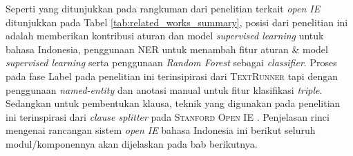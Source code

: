 Seperti yang ditunjukkan pada rangkuman dari penelitian terkait \textit{open IE} ditunjukkan pada Tabel \ref{tab:related_works_summary}, posisi dari penelitian ini adalah memberikan kontribusi aturan dan model \textit{supervised learning} untuk bahasa Indonesia, penggunaan NER untuk menambah fitur aturan \& model \textit{supervised learning} serta penggunaan \textit{Random Forest} sebagai \textit{classifier}. Proses pada fase Label pada penelitian ini terinsipirasi dari \textsc{TextRunner} \citep{banko2007open} tapi dengan penggunaan \textit{named-entity} dan anotasi manual untuk fitur klasifikasi \textit{triple}. Sedangkan untuk pembentukan klausa, teknik yang digunakan pada penelitian ini terinspirasi dari \textit{clause splitter} pada \textsc{Stanford Open IE} \citep{angeli2015leveraging}. Penjelasan rinci mengenai rancangan sistem \textit{open IE} bahasa Indonesia ini berikut seluruh modul/komponennya akan dijelaskan pada bab berikutnya.